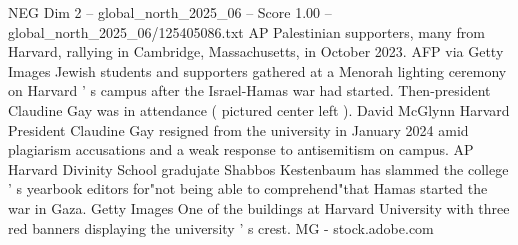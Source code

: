 \begin{textsample}{NEG Dim 2 – global\_north\_2025\_06 – Score 1.00 – global\_north\_2025\_06/125405086.txt}
AP Palestinian supporters, many from Harvard, rallying in Cambridge, Massachusetts, in October 2023.
AFP via Getty Images Jewish students and supporters gathered at a Menorah lighting ceremony on Harvard ' s campus after the Israel-Hamas war had started.
Then-president Claudine Gay was in attendance ( pictured center left ).
David McGlynn Harvard President Claudine Gay resigned from the university in January 2024 amid plagiarism accusations and a weak response to antisemitism on campus.
AP Harvard Divinity School gradujate Shabbos Kestenbaum has slammed the college ' s yearbook editors for"not being able to comprehend"that Hamas started the war in Gaza.
Getty Images One of the buildings at Harvard University with three red banners displaying the university ' s crest.
MG - stock.adobe.com

\end{textsample}
